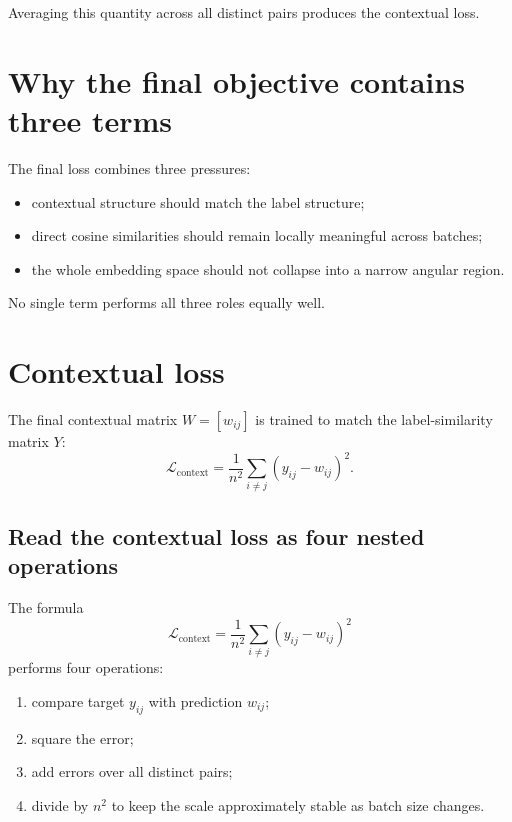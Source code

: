 \documentclass[11pt,oneside,openany]{book}
\theoremstyle{myplain}
\theoremstyle{definition}
\newcommand{\paperEq}[1]{\tag{P#1}}
\begin{document}
Averaging this quantity across all distinct pairs produces the contextual loss.

\section{Why the final objective contains three terms}

The final loss combines three pressures:
\begin{itemize}[leftmargin=*]
  \item contextual structure should match the label structure;
  \item direct cosine similarities should remain locally meaningful across batches;
  \item the whole embedding space should not collapse into a narrow angular region.
\end{itemize}
No single term performs all three roles equally well.



\section{Contextual loss}

The final contextual matrix $W=[w_{ij}]$ is trained to match the label-similarity matrix $Y$:
\begin{equation*}
  \boxed{\mathcal L_{\mathrm{context}}
  =\frac{1}{n^2}\sum_{i\ne j}(y_{ij}-w_{ij})^2.}
\paperEq{5}
\label{eq:lcontext}
\end{equation*}

\subsection{Read the contextual loss as four nested operations}

The formula
\[
\mathcal L_{\mathrm{context}}
=\frac{1}{n^2}\sum_{i\ne j}(y_{ij}-w_{ij})^2
\]
performs four operations:
\begin{enumerate}[leftmargin=*,itemsep=4pt]
  \item compare target $y_{ij}$ with prediction $w_{ij}$;
  \item square the error;
  \item add errors over all distinct pairs;
  \item divide by $n^2$ to keep the scale approximately stable as batch size changes.
\end{enumerate}
\end{document}
